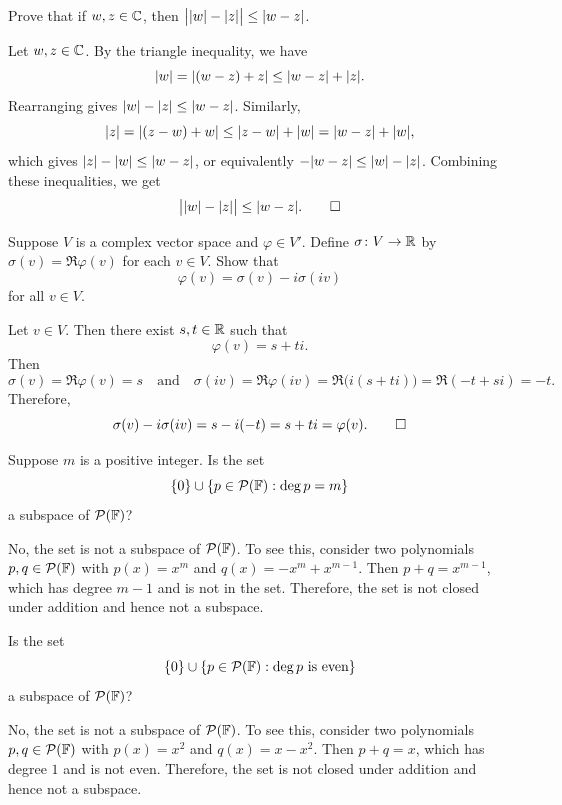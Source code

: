 \begin{exercise}
Prove that if $w,z\in\mathbb{C}$, then $\bigl\lvert\lvert w \rvert-\lvert z \rvert\bigr\rvert
\le\lvert w-z \rvert$.
\end{exercise}
\begin{solution}
Let $w,z\in\mathbb{C}$. By the triangle inequality, we have
\[ \lvert w \rvert=\lvert (w-z)+z \rvert\le\lvert w-z \rvert+\lvert z \rvert. \]
Rearranging gives $\lvert w \rvert-\lvert z \rvert\le\lvert w-z \rvert$. Similarly,
\[ \lvert z \rvert=\lvert (z-w)+w \rvert\le\lvert z-w \rvert+\lvert w \rvert=\lvert w-z \rvert+\lvert w \rvert, \]
which gives $\lvert z \rvert-\lvert w \rvert\le\lvert w-z \rvert$, or equivalently
$-\lvert w-z \rvert\le\lvert w \rvert-\lvert z \rvert$. Combining these inequalities, we get
\[ \bigl\lvert\lvert w \rvert-\lvert z \rvert\bigr\rvert\le\lvert w-z \rvert. \qedhere \]
\end{solution}

\begin{exercise}
Suppose $V$ is a complex vector space and $\varphi\in V'$. Define
$\sigma\colon V\to\mathbb{R}$ by $\sigma(v)=\Re\varphi(v)$ for each $v\in V$. Show that
\[ \varphi(v) = \sigma(v)-i\sigma(iv) \]
for all $v\in V$.
\end{exercise}
\begin{solution}
Let $v\in V$. Then there exist $s,t\in\mathbb{R}$ such that
\[ \varphi(v)=s+ti. \]
Then
\[ \sigma(v)=\mathfrak{R}\varphi(v)=s \quad\text{and}\quad
   \sigma(iv)=\mathfrak{R}\varphi(iv)=\mathfrak{R}\bigl(i(s+ti)\bigr)
   =\mathfrak{R}(-t+si)=-t. \]
Therefore,
\[ \sigma(v)-i\sigma(iv)=s-i(-t)=s+ti=\varphi(v). \qedhere \]
\end{solution}

\begin{exercise}
Suppose $m$ is a positive integer. Is the set
\[ \{0\}\cup\{p\in\mathcal{P}(\mathbb{F}) : \deg p=m\} \]
a subspace of $\mathcal{P}(\mathbb{F})$?
\end{exercise}
\begin{solution}
No, the set is not a subspace of $\mathcal{P}(\mathbb{F})$. To see this, consider two
polynomials $p,q\in\mathcal{P}(\mathbb{F})$ with $p(x)=x^m$ and $q(x)=-x^m+x^{m-1}$. Then
$p+q=x^{m-1}$, which has degree $m-1$ and is not in the set. Therefore, the set
is not closed under addition and hence not a subspace.
\end{solution}

\begin{exercise}
Is the set
\[ \{0\}\cup\{p\in\mathcal{P}(\mathbb{F}) : \deg p \text{ is even}\} \]
a subspace of $\mathcal{P}(\mathbb{F})$?
\end{exercise}
\begin{solution}
No, the set is not a subspace of $\mathcal{P}(\mathbb{F})$. To see this, consider two
polynomials $p,q\in\mathcal{P}(\mathbb{F})$ with $p(x)=x^2$ and $q(x)=x-x^2$. Then $p+q=x$,
which has degree $1$ and is not even. Therefore, the set is not closed under
addition and hence not a subspace.
\end{solution}

